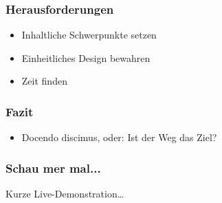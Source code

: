 \documentclass[12pt,ngerman]{beamer}
\begin{document}
\begin{frame}
\frametitle{Herausforderungen}

\begin{itemize}
\item Inhaltliche Schwerpunkte setzen
\item Einheitliches Design bewahren
\item Zeit finden
\end{itemize}
\end{frame}


\begin{frame}
\frametitle{Fazit}

\begin{itemize}
\item Docendo discimus, oder: Ist der Weg das Ziel?
\end{itemize}
\end{frame}


\begin{frame}
\frametitle{Schau mer mal...}

Kurze Live-Demonstration\ldots
\end{frame}
\end{document}
